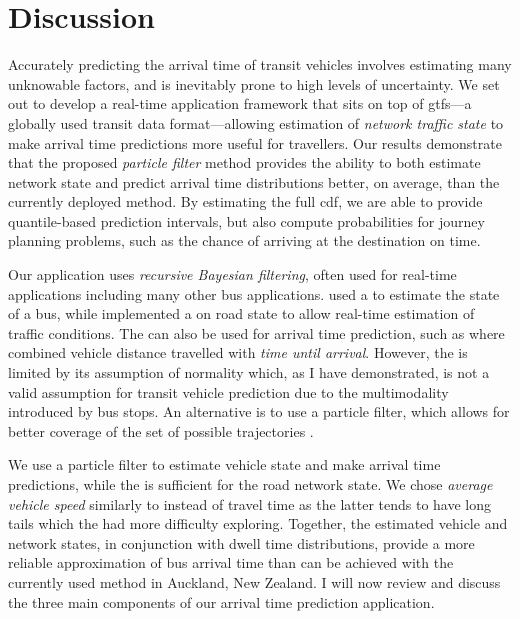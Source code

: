\chapter{Discussion}
\label{cha:discussion}


Accurately predicting the arrival time of transit vehicles involves estimating many unknowable factors, and is inevitably prone to high levels of uncertainty. We set out to develop a real-time application framework that sits on top of \gls{gtfs}---a globally used transit data format---allowing estimation of \emph{network traffic state} to make arrival time predictions more useful for travellers. Our results demonstrate that the proposed \emph{particle filter} method provides the ability to both estimate network state and predict arrival time distributions better, on average, than the currently deployed method. By estimating the full \gls{cdf}, we are able to provide quantile-based prediction intervals, but also compute probabilities for journey planning problems, such as the chance of arriving at the destination on time.


Our application uses \emph{recursive Bayesian filtering}, often used for real-time applications including many other bus applications. \citet{Wall_1999,Dailey_2001,Cathey_2003} used a \kf{} to estimate the state of a bus, while \citep{Shalaby_2004,cn} implemented a \kf{} on road state to allow real-time estimation of traffic conditions. The \kf{} can also be used for arrival time prediction, such as where \citet{Wall_1999,Dailey_2001} combined vehicle distance travelled with \emph{time until arrival}. However, the \kf{} is limited by its assumption of normality which, as I have demonstrated, is not a valid assumption for transit vehicle prediction due to the multimodality introduced by bus stops. An alternative is to use a particle filter, which allows for better coverage of the set of possible trajectories \citep{Hans_2015}.


We use a particle filter to estimate vehicle state and make arrival time predictions, while the \kf{} is sufficient for the road network state. We chose \emph{average vehicle speed} similarly to \citet{Celan_2017,Celan_2018} instead of travel time \citep{Shalaby_2004} as the latter tends to have long tails which the \kf{} had more difficulty exploring. Together, the estimated vehicle and network states, in conjunction with dwell time distributions, provide a more reliable approximation of bus arrival time than can be achieved with the currently used method in Auckland, New Zealand. I will now review and discuss the three main components of our arrival time prediction application.


